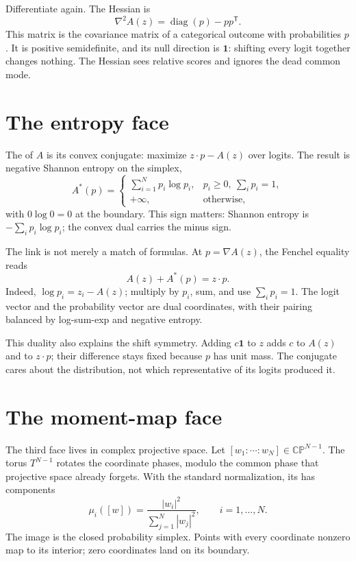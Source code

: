 Differentiate again. The Hessian is
\begin{equation}
  \nabla^2 A(z)=\operatorname{diag}(p)-pp^\mathsf{T}.
  \label{eq:lse-hessian}
\end{equation}
This matrix is the covariance matrix of a categorical outcome with
probabilities $p$. It is positive semidefinite, and its null direction is
$\mathbf{1}$: shifting every logit together changes nothing. The Hessian sees
relative scores and ignores the dead common mode.

\section{The entropy face}

The  of $A$ is its convex conjugate: maximize
$z\cdot p-A(z)$ over logits. The result is negative Shannon entropy on the
simplex,
\begin{equation}
  A^*(p)=
  \begin{cases}
    \displaystyle\sum_{i=1}^N p_i\log p_i,
      & p_i\geq 0,\ \sum_i p_i=1,\\
    +\infty, & \text{otherwise},
  \end{cases}
  \label{eq:lse-conjugate}
\end{equation}
with $0\log 0=0$ at the boundary. This sign matters: Shannon entropy is
$-\sum_i p_i\log p_i$; the convex dual carries the minus sign.

The link is not merely a match of formulas. At $p=\nabla A(z)$, the
Fenchel equality reads
\begin{equation}
  A(z)+A^*(p)=z\cdot p.
  \label{eq:fenchel-equality}
\end{equation}
Indeed, $\log p_i=z_i-A(z)$; multiply by $p_i$, sum, and use
$\sum_i p_i=1$. The logit vector and the probability vector are dual
coordinates, with their pairing balanced by log-sum-exp and negative
entropy.

This duality also explains the shift symmetry. Adding $c\mathbf{1}$ to $z$
adds $c$ to $A(z)$ and to $z\cdot p$; their difference stays fixed because
$p$ has unit mass. The conjugate cares about the distribution, not which
representative of its logits produced it.

\section{The moment-map face}

The third face lives in complex projective space. Let
$[w_1:\cdots:w_N]\in\mathbb{CP}^{N-1}$. The torus $T^{N-1}$ rotates the
coordinate phases, modulo the common phase that projective space already
forgets. With the standard normalization, its  has components
\begin{equation}
  \mu_i([w])=\frac{|w_i|^2}{\sum_{j=1}^N |w_j|^2},
  \qquad i=1,\ldots,N.
  \label{eq:projective-moment-map}
\end{equation}
The image is the closed probability simplex. Points with every coordinate
nonzero map to its interior; zero coordinates land on its boundary.
\citeneeded

